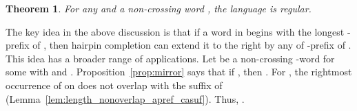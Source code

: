\documentclass{article}
\theoremstyle{plain}
\newtheorem{theorem}{Theorem}
\theoremstyle{remark}
\begin{document}
\begin{comment}
On , if the -th occurrence of  overlaps with the suffix  (primer), then the primer cannot combine with the occurrence of , and hence, hairpin completion cannot extend  to the right by . 
Such  is said to be {\it initially-inert}. 
Let  be the largest index such that  is initially-active. 
Then . 
For , we define the value ; this specifies how long  has to be extended to the right so that its suffix  can combine with the -th occurrence of  on  to add  by right hairpin completion. 
Then we can describe the set of all ``ways'' to extend  to the right by hairpin completion as follows: 


Then

This is a regular language, and we will prove that this is actually the hairpin completion of . 


\begin{theorem}\label{thm:m1_nonx_representation}
	For any  and a non-crossing  word , . 
\end{theorem}
\begin{proof}
	Let us prove  first. 
	By definition, any word  in  can be factorized as . 
	Compare the leftmost factor  and the complement of the rightmost factor  with respect to their index. 
	Assume that . 
	Then . 
	Hence, one-step left hairpin completion can derive  from the word . 
	In the case when , the same argument implies that . 
	Due to , the repetition of this process eventually reduces  into a word  for some . 
	Since , iterated right hairpin completion can produce  from . 
	Thus, . 

	Next we prove the converse inclusion on the length of derivation by hairpin completion. 
	Clearly . 
	Let us assume that a word in  can be written as  with . 
	If left hairpin completion extends this word to the left by , then  and this means  (see Lemma~\ref{lem:aprefix_prefix}). 
	Thus, there exist  such that  and . 
	It it trivial that this inequality remains valid in the right hairpin completion. 
\end{proof}
\end{comment}

\begin{theorem}\label{thm:m1nonx_regular}
	For any  and a non-crossing  word , the language  is regular. 
\end{theorem}

The key idea in the above discussion is that if a word in  begins with the longest -prefix  of , then hairpin completion can extend it to the right by any of -prefix of . 
This idea has a broader range of applications. 
Let  be a non-crossing -word for some  with  and . 
Proposition~\ref{prop:mirror} says that if , then . 
For , the rightmost occurrence of  on  does not overlap with the suffix  of  (Lemma~\ref{lem:length_nonoverlap_apref_casuf}). 
Thus, . 
\end{document}
